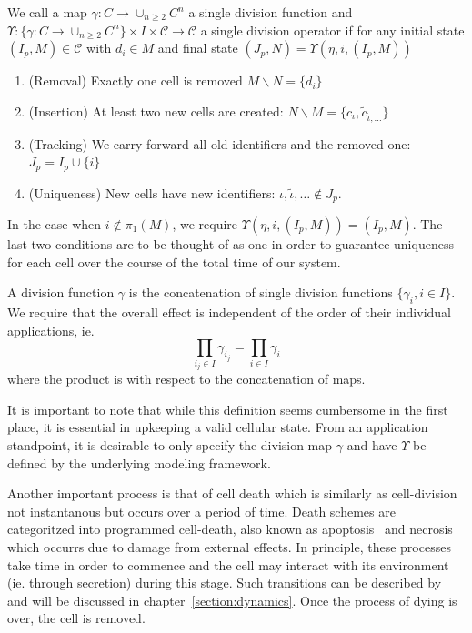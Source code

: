 \begin{definition}
    \label{definition:cell-division-single}
    We call a map $\gamma:C\rightarrow \cup_{n\geq 2}C^n$ a single division function and
    $\Upsilon:\{\gamma:C\rightarrow \cup_{n\geq 2}C^n\}\times I\times\mathscr{C}\rightarrow\mathscr{C}$ a 
    single division operator if for any initial state $(I_p,M)\in\mathscr{C}$ with $d_i\in M$ and
    final state $(J_p,N)=\Upsilon(\eta,i,(I_p,M))$
    \begin{enumerate}
        \item (Removal) Exactly one cell is removed $M\backslash N=\{d_i\}$
        \item (Insertion) At least two new cells are created:
            $N\backslash M=\{c_\iota,\tilde{c}_{\tilde{\iota},\dots}\}$
        \item (Tracking) We carry forward all old identifiers and the removed one: $J_p=I_p\cup\{i\}$
        \item (Uniqueness) New cells have new identifiers: $\iota,\tilde{\iota},\dots\notin J_p$.
    \end{enumerate}
    In the case when $i\notin\pi_1(M)$, we require $\Upsilon(\eta,i,(I_p,M))=(I_p,M)$.
    The last two conditions are to be thought of as one in order to guarantee uniqueness for each
    cell over the course of the total time of our system.
\end{definition}

\begin{definition}
    \label{definition:cell-division}
    A division function $\gamma$ is the concatenation of single division functions
    $\{\gamma_i,i\in I\}$.
    We require that the overall effect is independent of the order of their individual applications,
    ie.
    \begin{equation}
        \prod\limits_{i_j\in I}\gamma_{i_j} = \prod\limits_{i\in I}\gamma_i
    \end{equation}
    where the product is with respect to the concatenation of maps.
\end{definition}

It is important to note that while this definition seems cumbersome in the first place, it is
essential in upkeeping a valid cellular state.
From an application standpoint, it is desirable to only specify the division map $\gamma$ and have
$\Upsilon$ be defined by the underlying modeling framework.

Another important process is that of cell death which is similarly as cell-division not instantanous
but occurs over a period of time.
Death schemes are categoritzed into programmed cell-death, also known as apoptosis~\cite{Kerr1965}
and necrosis~\cite{Gerschenson2001} which occurrs due to damage from external effects.
In principle, these processes take time in order to commence and the cell may interact with its
environment (ie. through secretion) during this stage.
Such transitions can be described by  and will be discussed in
chapter~\ref{section:dynamics}.
Once the process of dying is over, the cell is removed.

